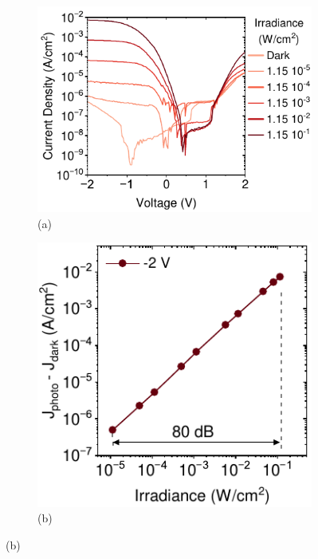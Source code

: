 \begin{figure}[htbp]
    \centering
    \begin{subfigure}[t]{0.53\textwidth}
        \centering
        \includegraphics[width=\textwidth]{chapters/transport_layers/images/JV_f_illumination.pdf} %
        \caption*{(a)}
    \end{subfigure}
    \hfill
    \begin{subfigure}[t]{0.4\textwidth}
        \centering
        \includegraphics[width=\textwidth]{chapters/transport_layers/images/linearity.pdf} %
        \caption*{(b)}
    \end{subfigure}


\end{figure}
